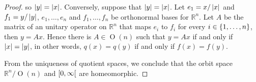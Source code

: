 \begin{proof}
    so $\left\vert{y}\right\vert = \left\vert{x}\right\vert$. Conversely, suppose that $\left\vert{y}\right\vert = \left\vert{x}\right\vert$. Let $e_{1} = x/\left\vert{x}\right\vert$ and $f_{1} = y/\left\vert{y}\right\vert$, $e_{1}, \ldots, e_{n}$ and $f_{1}, \ldots, f_{n}$ be orthonormal bases for $\mathbb{R}^{n}$. Let $A$ be the matrix of an unitary operator on $\mathbb{R}^{n}$ that maps $e_{i}$ to $f_{i}$ for every $i \in \left\{{1, \ldots, n}\right\}$, then $y = Ax$. Hence there is $A \in \operatorname{O}(n)$ such that $y = Ax$ if and only if $\left\vert{x}\right\vert = \left\vert{y}\right\vert$, in other words, $q(x) = q(y)$ if and only if $f(x) = f(y)$.

    From the uniqueness of quotient spaces, we conclude that the orbit space $\mathbb{R}^{n}/\operatorname{O}(n)$ and $\left[{0, \infty}\right[$ are homeomorphic.
\end{proof}
